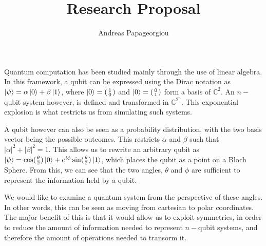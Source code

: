 \documentclass[a4paper,10pt]{article}
\title{Research Proposal}
\author{Andreas Papageorgiou}
\date{}
\newcommand{\cVec}[2]{(\begin{smallmatrix}#1\\#2\end{smallmatrix})}
\begin{document}
\maketitle
\thispagestyle{empty}

\onehalfspacing

Quantum computation has been studied mainly through the use of linear algebra. In this framework, a qubit can be expressed
using the Dirac notation as $\Ket{\psi} = \alpha \Ket{0} + \beta \Ket{1}$, where $\Ket{0} = \cVec{1}{0}$ and $\Ket{0} = \cVec{0}{1}$
form a basis of $\mathbb{C}^2$. An $n-$qubit system however, is defined and transformed in $\mathbb{C}^{2^n}$.
This exponential explosion is what restricts us from simulating such systems.

A qubit however can also be seen as a probability distribution, with the two basis vector
being the possible outcomes. This restricts $\alpha$ and $\beta$ such that $|\alpha|^2 + |\beta|^2 = 1$. This
allows us to rewrite an arbitrary qubit as $\Ket{\psi} = \cos(\frac{\theta}{2})\Ket{0} + e^{i\phi}\sin(\frac{\theta}{2})\Ket{1}$,
which places the qubit as a point on a Bloch Sphere. From this, we can see that the two angles, $\theta$ and $\phi$ are sufficient
to represent the information held by a qubit.

We would like to examine a quantum system from the perspective of these angles. In other words, this can be seen as moving from
cartesian to polar coordinates. The major benefit of this is that it would allow us to exploit symmetries, in order to reduce
the amount of information needed to represent $n-$qubit systems, and therefore the amount of operations needed to transorm it.

\end{document}
